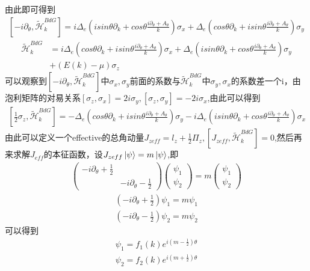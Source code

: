 \documentclass[22pt]{article}
\begin{document}
由此即可得到
\begin{align}
	\nonumber
	[-i\partial_{\theta},\tilde{\mathcal{H}}_k^{BdG}]=i\Delta_e(isin\theta\partial_k+cos\theta\frac{i\partial_{\theta}+A_{\theta}}{k})\sigma_x+\Delta_e(cos\theta\partial_k+isin\theta\frac{i\partial_{\theta}+A_{\theta}}{k})\sigma_y
\end{align}
\begin{align}
	\nonumber
	\tilde{\mathcal{H}}_k^{BdG}&=i\Delta_e(cos\theta\partial_k+isin\theta\frac{i\partial_{\theta}+A_{\theta}}{k})\sigma_x+\Delta_e(isin\theta\partial_k+cos\theta\frac{i\partial_{\theta}+A_{\theta}}{k})\sigma_y 
	\\&+(E(k)-\mu)\sigma_z
\end{align}
可以观察到$[-i\partial_{\theta},\tilde{\mathcal{H}}_k^{BdG}]$中$\sigma_x,\sigma_y$前面的系数与$\tilde{\mathcal{H}}_k^{BdG}$中$\sigma_y,\sigma_x$的系数差一个i，由泡利矩阵的对易关系$[\sigma_z,\sigma_x]=2i\sigma_y,[\sigma_z,\sigma_y]=-2i\sigma_x$,由此可以得到
\begin{align}
	\nonumber
	[\frac{1}{2}\sigma_z,\tilde{\mathcal{H}}_k^{BdG}]=-\Delta_e(cos\theta\partial_k+isin\theta\frac{i\partial_{\theta}+A_{\theta}}{k})\sigma_y-i\Delta_e(isin\theta\partial_k+cos\theta\frac{i\partial_{\theta}+A_{\theta}}{k})\sigma_x
\end{align}
由此可以定义一个effective的总角动量$J_{zeff}=l_z+\frac{1}{2}\Pi_z,[J_{zeff},\tilde{\mathcal{H}}_k^{BdG}]=0$,然后再来求解$J_{eff}$的本征函数，设$J_{zeff}\ket{\psi}=m\ket{\psi}$,即
\begin{align}
	\begin{pmatrix}
		-i\partial_{\theta}+\frac{1}{2} & \\
		& -i\partial_{\theta}-\frac{1}{2}
	\end{pmatrix}
	\begin{pmatrix}
		\psi_1\\
		\psi_2
	\end{pmatrix}
	=m
	\begin{pmatrix}
		\psi_1\\
		\psi_2
	\end{pmatrix}
\end{align}
\begin{align}
	(-i\partial_{\theta}+\frac{1}{2})\psi_1=m\psi_1 \\
	(-i\partial_{\theta}-\frac{1}{2})\psi_2=m\psi_2
\end{align}
可以得到
\begin{align}
	\psi_1=f_1(k)e^{i(m-\frac{1}{2})\theta} \\
	\psi_2=f_2(k)e^{i(m+\frac{1}{2})\theta}
\end{align}
\end{document}
